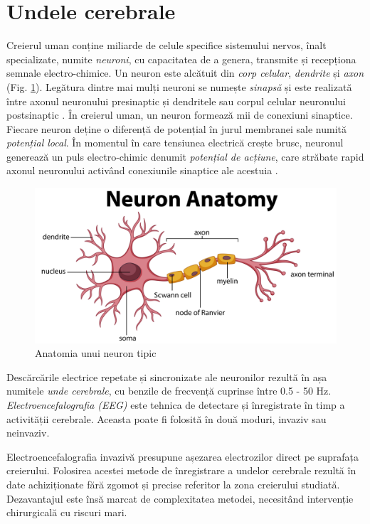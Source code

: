 \section{Undele cerebrale}\label{sec:undecerebrale}
Creierul uman conține miliarde de celule specifice sistemului nervos, înalt specializate, numite \textit{neuroni}, cu capacitatea de a genera, transmite și recepționa semnale electro-chimice. Un neuron este alcătuit din \textit{corp celular}, \textit{dendrite} și \textit{axon} (Fig. \ref{fig:neuron-anatomy}). Legătura dintre mai mulți neuroni se numește \textit{sinapsă} și este realizată între axonul neuronului presinaptic și dendritele sau corpul celular neuronului postsinaptic \cite{online:sistem-nervos}. În creierul uman, un neuron formează mii de conexiuni sinaptice. Fiecare neuron deține o diferență de potențial în jurul membranei sale numită \textit{potențial local}. În momentul în care tensiunea electrică crește brusc, neuronul generează un puls electro-chimic denumit \textit{potențial de acțiune}, care străbate rapid axonul neuronului activând conexiunile sinaptice ale acestuia \cite{online:neuronul-biologic}.
\begin{figure}[ht]
\centering
\includegraphics[width=\textwidth, keepaspectratio]{fig/cap2/neuron-anatomy.jpg}
\caption{Anatomia unui neuron tipic \cite{online:neuron-anatomy}}
\label{fig:neuron-anatomy}
\end{figure}

Descărcările electrice repetate și sincronizate ale neuronilor rezultă în așa numitele \textit{unde cerebrale}, cu benzile de frecvență cuprinse între 0.5 - 50 \si{\hertz}. \textit{Electroencefalografia (EEG)} este tehnica de detectare și înregistrate în timp a activității cerebrale. Aceasta poate fi folosită în două moduri, invaziv sau neinvaziv. 

Electroencefalografia invazivă presupune așezarea electrozilor direct pe suprafața creierului. Folosirea acestei metode de înregistrare a undelor cerebrale rezultă în date achiziționate fără zgomot și precise referitor la zona creierului studiată. Dezavantajul este însă marcat de complexitatea metodei, necesitând intervenție chirurgicală cu riscuri mari.

